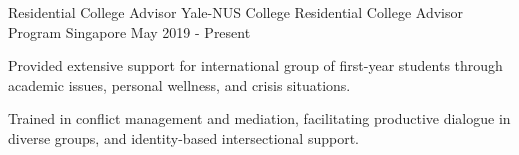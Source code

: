 

\begin{cventries}

  \cventry
  {Residential College Advisor} %
  {Yale-NUS College Residential College Advisor Program} %
  {Singapore} %
  {May 2019 - Present} %
  {
    \begin{cvitems} %
    \item {Provided extensive support for international group of first-year
        students through academic issues, personal wellness, and crisis
        situations.}
    \item {Trained in conflict management and mediation, facilitating productive
      dialogue in diverse groups, and identity-based intersectional support.}
    \end{cvitems}
  }



\end{cventries}
